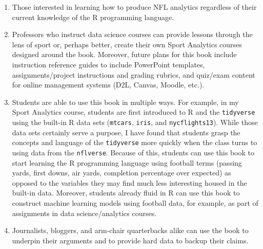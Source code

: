 \documentclass[
  letterpaper,
]{krantz}
\begin{document}
\begin{enumerate}
\def\labelenumi{\arabic{enumi}.}
\item
  Those interested in learning how to produce NFL analytics regardless
  of their current knowledge of the R programming language.
\item
  Professors who instruct data science courses can provide lessons
  through the lens of sport or, perhaps better, create their own Sport
  Analytics courses designed around the book. Moreover, future plans for
  this book include instruction reference guides to include PowerPoint
  templates, assignments/project instructions and grading rubrics, and
  quiz/exam content for online management systems (D2L, Canvas, Moodle,
  etc.).
\item
  Students are able to use this book in multiple ways. For example, in
  my Sport Analytics course, students are first introduced to R and the
  \texttt{tidyverse} using the built-in R data sets (\texttt{mtcars},
  \texttt{iris}, and \texttt{nycflights13}). While those data sets
  certainly serve a purpose, I have found that students grasp the
  concepts and language of the \texttt{tidyverse} more quickly when the
  class turns to using data from the \texttt{nflverse}. Because of this,
  students can use this book to start learning the R programming
  language using football terms (passing yards, first downs, air yards,
  completion percentage over expected) as opposed to the variables they
  may find much less interesting housed in the built-in data. Moreover,
  students already fluid in R can use this book to construct machine
  learning models using football data, for example, as part of
  assignments in data science/analytics courses.
\item
  Journalists, bloggers, and arm-chair quarterbacks alike can use the
  book to underpin their arguments and to provide hard data to backup
  their claims.
\end{enumerate}
\end{document}
